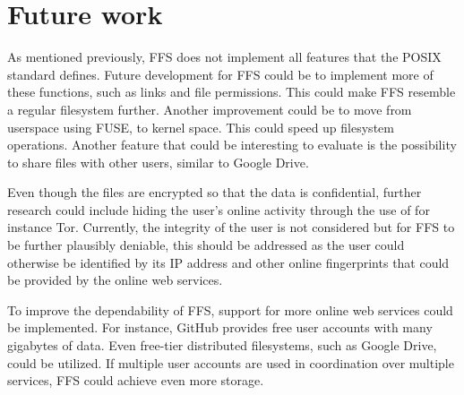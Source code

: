 
\section{Future work}
\label{sec:futureWork}

As mentioned previously, \gls{FFS} does not implement all features that the POSIX standard defines. Future development for \gls{FFS} could be to implement more of these functions, such as links and file permissions. This could make \gls{FFS} resemble a regular filesystem further. Another improvement could be to move from userspace using \gls{FUSE}, to kernel space. This could speed up filesystem operations. Another feature that could be interesting to evaluate is the possibility to share files with other users, similar to Google Drive.

Even though the files are encrypted so that the data is confidential, further research could include hiding the user's online activity through the use of for instance Tor. Currently, the integrity of the user is not considered but for \gls{FFS} to be further plausibly deniable, this should be addressed as the user could otherwise be identified by its IP address and other online fingerprints that could be provided by the online web services.

To improve the dependability of \gls{FFS}, support for more online web services could be implemented. For instance, GitHub provides free user accounts with many gigabytes of data. Even free-tier distributed filesystems, such as Google Drive, could be utilized. If multiple user accounts are used in coordination over multiple services, \gls{FFS} could achieve even more storage.





